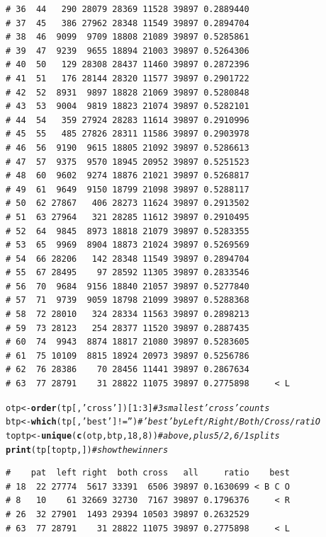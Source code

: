 \documentclass{article}\usepackage[]{graphicx}\usepackage[]{color}
\makeatletter
\newcommand{\hlnum}[1]{\textcolor[rgb]{0.686,0.059,0.569}{#1}}%
\newcommand{\hlstr}[1]{\textcolor[rgb]{0.192,0.494,0.8}{#1}}%
\newcommand{\hlcom}[1]{\textcolor[rgb]{0.678,0.584,0.686}{\textit{#1}}}%
\newcommand{\hlopt}[1]{\textcolor[rgb]{0,0,0}{#1}}%
\newcommand{\hlstd}[1]{\textcolor[rgb]{0.345,0.345,0.345}{#1}}%
\newcommand{\hlkwb}[1]{\textcolor[rgb]{0.69,0.353,0.396}{#1}}%
\newcommand{\hlkwd}[1]{\textcolor[rgb]{0.737,0.353,0.396}{\textbf{#1}}}%
\newenvironment{kframe}{%
 \def\at@end@of@kframe{}%
 \ifinner\ifhmode%
  \def\at@end@of@kframe{\end{minipage}}%
  \begin{minipage}{\columnwidth}%
 \fi\fi%
 \def\FrameCommand##1{\hskip\@totalleftmargin \hskip-\fboxsep
 \colorbox{shadecolor}{##1}\hskip-\fboxsep
     \hskip-\linewidth \hskip-\@totalleftmargin \hskip\columnwidth}%
 \MakeFramed {\advance\hsize-\width
   \@totalleftmargin\z@ \linewidth\hsize
   \@setminipage}}%
 {\par\unskip\endMakeFramed%
 \at@end@of@kframe}
\newenvironment{knitrout}{}{} %
\makeatother
\begin{document}
\begin{knitrout}
\begin{kframe}
\begin{verbatim}
# 36  44   290 28079 28369 11528 39897 0.2889440        
# 37  45   386 27962 28348 11549 39897 0.2894704        
# 38  46  9099  9709 18808 21089 39897 0.5285861        
# 39  47  9239  9655 18894 21003 39897 0.5264306        
# 40  50   129 28308 28437 11460 39897 0.2872396        
# 41  51   176 28144 28320 11577 39897 0.2901722        
# 42  52  8931  9897 18828 21069 39897 0.5280848        
# 43  53  9004  9819 18823 21074 39897 0.5282101        
# 44  54   359 27924 28283 11614 39897 0.2910996        
# 45  55   485 27826 28311 11586 39897 0.2903978        
# 46  56  9190  9615 18805 21092 39897 0.5286613        
# 47  57  9375  9570 18945 20952 39897 0.5251523        
# 48  60  9602  9274 18876 21021 39897 0.5268817        
# 49  61  9649  9150 18799 21098 39897 0.5288117        
# 50  62 27867   406 28273 11624 39897 0.2913502        
# 51  63 27964   321 28285 11612 39897 0.2910495        
# 52  64  9845  8973 18818 21079 39897 0.5283355        
# 53  65  9969  8904 18873 21024 39897 0.5269569        
# 54  66 28206   142 28348 11549 39897 0.2894704        
# 55  67 28495    97 28592 11305 39897 0.2833546        
# 56  70  9684  9156 18840 21057 39897 0.5277840        
# 57  71  9739  9059 18798 21099 39897 0.5288368        
# 58  72 28010   324 28334 11563 39897 0.2898213        
# 59  73 28123   254 28377 11520 39897 0.2887435        
# 60  74  9943  8874 18817 21080 39897 0.5283605        
# 61  75 10109  8815 18924 20973 39897 0.5256786        
# 62  76 28386    70 28456 11441 39897 0.2867634        
# 63  77 28791    31 28822 11075 39897 0.2775898     < L
\end{verbatim}
\end{kframe}
\end{knitrout}
\begin{knitrout}\footnotesize
{}\color{fgcolor}\begin{kframe}
\begin{alltt}
\hlstd{otp} \hlkwb{<-} \hlkwd{order}\hlstd{(tp[,}\hlstr{'cross'}\hlstd{])[}\hlnum{1}\hlopt{:}\hlnum{3}\hlstd{]}    \hlcom{# 3 smallest 'cross' counts}
\hlstd{btp} \hlkwb{<-} \hlkwd{which}\hlstd{(tp[,}\hlstr{'best'}\hlstd{]} \hlopt{!=} \hlstr{''}\hlstd{)}    \hlcom{# 'best' by Left/Right/Both/Cross/ratiO}
\hlstd{toptp} \hlkwb{<-} \hlkwd{unique}\hlstd{(}\hlkwd{c}\hlstd{(otp,btp,}\hlnum{18}\hlstd{,}\hlnum{8}\hlstd{))}   \hlcom{# above, plus 5/2, 6/1 splits}
\hlkwd{print}\hlstd{(tp[toptp,])}                  \hlcom{# show the winners}
\end{alltt}
\begin{verbatim}
#    pat  left right  both cross   all     ratio    best
# 18  22 27774  5617 33391  6506 39897 0.1630699 < B C O
# 8   10    61 32669 32730  7167 39897 0.1796376     < R
# 26  32 27901  1493 29394 10503 39897 0.2632529        
# 63  77 28791    31 28822 11075 39897 0.2775898     < L
\end{verbatim}
\end{kframe}
\end{knitrout}
\end{document}
